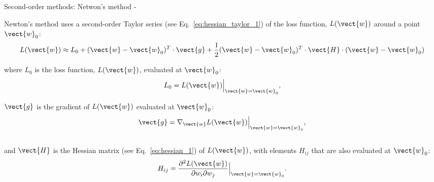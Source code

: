 

\begin{frame}[t,allowframebreaks]{
    Second-order methods: Netwon's method -}

    \gls{Newton's method} uses a second-order
    \gls{Taylor series} 
    (see Eq.~\ref{eq:hessian_taylor_1})
    of the \gls{loss function}, $L(\vect{w})$
    around a point $\vect{w}_0$:\\
    \vspace{-0.2cm}
    \begin{equation}
        L(\vect{w}) \approx 
          L_0 + 
          (\vect{w}- \vect{w}_0)^T \cdot \vect{g} +
          \frac{1}{2} (\vect{w} - \vect{w}_0)^T \cdot 
            \vect{H} \cdot (\vect{w} - \vect{w}_0)
        \label{eq:newton_quadratic_loss_approximation}    
    \end{equation}

    where $L_0$ is the \gls{loss function}, $L(\vect{w})$,
    evaluated at $\vect{w}_0$:\\
    \vspace{-0.2cm}
    \begin{equation}
        L_0 = L(\vect{w}) \Big\rvert_{\vect{w}=\vect{w}_0},
    \end{equation}
    
    $\vect{g}$ is the \gls{gradient} 
    of $L(\vect{w})$ evaluated at $\vect{w}_0$:\\
    \vspace{-0.2cm}
    \begin{equation}
        \vect{g} = \nabla_{\vect{w}}L(\vect{w}) \Big\rvert_{\vect{w}=\vect{w}_0},
    \end{equation}\\

    and $\vect{H}$ is the \gls{Hessian matrix} 
    (see Eq.~\ref{eq:hessian_1}) of $L(\vect{w})$, 
    with elements $H_{ij}$ that are also evaluated at $\vect{w}_0$:\\
    \vspace{-0.2cm}
    \begin{equation}
        H_{ij} = 
        \frac{\partial^2 L(\vect{w})}{\partial w_i \partial w_j}
        \Big\rvert_{\vect{w}=\vect{w}_0}.
    \end{equation}\\

    \framebreak
 


\end{frame}
